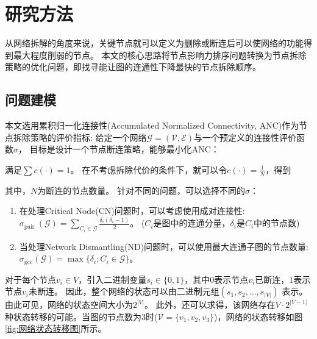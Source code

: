 \documentclass[twocolumn]{morningstar}
\begin{document}
\section{研究方法}\label{sec:Methods}

从网络拆解的角度来说，关键节点就可以定义为删除或断连后可以使网络的功能得到最大程度削弱的节点\cite{李天梅2019复杂网络的关键节点识别}。
本文的核心思路将节点影响力排序问题转换为节点拆除策略的优化问题，即找寻能让图的连通性下降最快的节点拆除顺序。

\subsection{问题建模}\label{sec:ProblemFormulation}

本文选用累积归一化连接性(Accumulated Normalized Connectivity, ANC)作为节点拆除策略的评价指标\cite{schneider2011ANC}: 
给定一个网络$\mathcal{G}=(\mathcal{V},\mathcal{E})$与一个预定义的连接性评价函数$\sigma$，
目标是设计一个节点断连策略，能够最小化ANC：


\noindent 满足$\sum c(\cdot) = 1$。
在不考虑拆除代价的条件下，就可以令$c(\cdot) = \frac{1}{N}$，得到


\noindent 其中，$N$为断连的节点数量。
针对不同的问题，可以选择不同的$\sigma$：

\begin{enumerate}[leftmargin=1em]
    \item 在处理Critical Node(CN)问题\cite{arulselvan2009恐怖分子网络_CN}时，可以考虑使用成对连接性:
    $\sigma_{\text {pair }}(\mathcal{G})=\sum_{C_i \in \mathcal{G}} \frac{\delta_i(\delta_i-1)}{2}$。
    ($C_i$是图中的连通分量，$\delta_i$是$C_i$中的节点数)
    \item 当处理Network Dismantling(ND)问题\cite{braunstein2016ND}时，可以使用最大连通子图的节点数量:
    $\sigma_{\mathrm{gcc}}(\mathcal{G})=\max \{\delta_i ; C_i \in \mathcal{G}\}$。
\end{enumerate}

对于每个节点$v_i \in V$，引入二进制变量$s_i \in \{0,1\}$，其中$0$表示节点$v_i$已断连，$1$表示节点$v_i$未断连。
因此，整个网络的状态可以由二进制元组$(s_1, s_2, \ldots, s_{|V|})$ 表示。由此可见，网络的状态空间大小为$2^{|V|}$。
此外，还可以求得，该网络存在$V\cdot2^{|V-1|}$种状态转移的可能。当图的节点数为3时($\mathcal{V} = \{v_1, v_2, v_3\}$)，网络的状态转移如图\ref{fig:网络状态转移图}所示。


\end{document}
